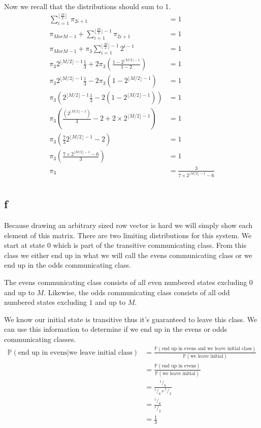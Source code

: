 \documentclass{article}
\newcommand{\prob}{\mathbb{P}}
\begin{document}
Now we recall that the distributions should sum to 1.
\begin{align*}
    \sum_{i=1}^{\lfloor \frac{M}{2} \rfloor} \pi_{2i+1} &= 1 \\
    \pi_{M or M-1} + \sum_{i=1}^{\lfloor \frac{M}{2} \rfloor - 1} \pi_{2i+1} &= 1 \\
    \pi_{M or M-1} + \pi_{3} \sum_{i=1}^{\lfloor \frac{M}{2} \rfloor - 1} 2^{i-1} &= 1 \\
    \pi_3 2^{\lfloor M/2 \rfloor - 1} \frac{1}{3}
    + 2 \pi_{3} \left(\frac{1-2^{\lfloor M/2 \rfloor - 1}}{1-2}\right) &= 1 \\
    \pi_3 2^{\lfloor M/2 \rfloor - 1} \frac{1}{3}
    - 2 \pi_{3} \left(1-2^{\lfloor M/2 \rfloor - 1}\right) &= 1 \\
    \pi_3 \left( 2^{\lfloor M/2 \rfloor - 1} \frac{1}{3}
    - 2 \left(1-2^{\lfloor M/2 \rfloor - 1}\right)\right) &= 1 \\
    \pi_3 \left(\frac{\left(2^{\lfloor M/2 \rfloor - 1}\right)}{3}
    - 2 + 2\times2^{\lfloor M/2 \rfloor - 1}\right) &= 1 \\
    \pi_3 \left(\frac{7}{3} 2^{\lfloor M/2 \rfloor - 1} - 2\right) &= 1 \\
    \pi_3 \left(\frac{7\times2^{\lfloor M/2 \rfloor - 1} - 6}{3}\right) &= 1 \\
    \pi_3 &= \frac{3}{7\times2^{\lfloor M/2 \rfloor - 1} - 6} \\
\end{align*}

\subsection{f}
Because drawing an arbitrary sized row vector is hard we will simply show each
element of this matrix.
There are two limiting distributions for this system. We start at state $0$
which is part of the transitive communicating class. From this class we either
end up in what we will call the evens communicating class or we end up in the
odds communicating class.

The evens communicating class consists of all even numbered states excluding
$0$ and up to $M$.
Likewise, the odds communicating class consists of all odd numbered states
excluding $1$ and up to $M$.

We know our initial state is transitive thus it's guaranteed to leave this
class. We can use this information to determine if we end up in the
evens or odds communicating classes.
\begin{align*}
    \prob(\text{end up in evens} | \text{we leave initial class})
    &= \frac{\prob(\text{end up in evens and we leave initial class})}{\prob(\text{we leave initial})} \\
    &= \frac{\prob(\text{end up in evens})}{\prob(\text{we leave initial})} \\
    &= \frac{^1/_6}{^1/_6 + ^1/_3} \\
    &= \frac{^1/_6}{^1/_2} \\
    &= \frac{1}{3} \\
\end{align*}
\end{document}
